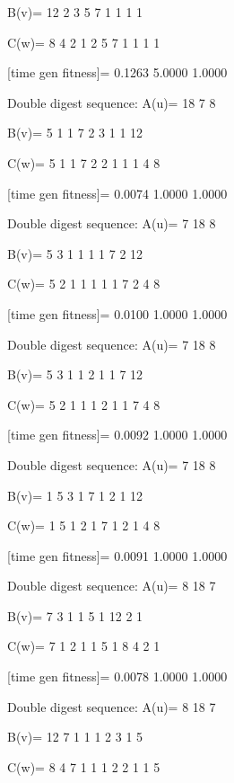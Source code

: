 B(v)=
    12     2     3     5     7     1     1     1     1

C(w)=
     8     4     2     1     2     5     7     1     1     1     1

[time gen fitness]=
    0.1263    5.0000    1.0000

Double digest sequence:
A(u)=
    18     7     8

B(v)=
     5     1     1     7     2     3     1     1    12

C(w)=
     5     1     1     7     2     2     1     1     1     4     8

[time gen fitness]=
    0.0074    1.0000    1.0000

Double digest sequence:
A(u)=
     7    18     8

B(v)=
     5     3     1     1     1     1     7     2    12

C(w)=
     5     2     1     1     1     1     1     7     2     4     8

[time gen fitness]=
    0.0100    1.0000    1.0000

Double digest sequence:
A(u)=
     7    18     8

B(v)=
     5     3     1     1     2     1     1     7    12

C(w)=
     5     2     1     1     1     2     1     1     7     4     8

[time gen fitness]=
    0.0092    1.0000    1.0000

Double digest sequence:
A(u)=
     7    18     8

B(v)=
     1     5     3     1     7     1     2     1    12

C(w)=
     1     5     1     2     1     7     1     2     1     4     8

[time gen fitness]=
    0.0091    1.0000    1.0000

Double digest sequence:
A(u)=
     8    18     7

B(v)=
     7     3     1     1     5     1    12     2     1

C(w)=
     7     1     2     1     1     5     1     8     4     2     1

[time gen fitness]=
    0.0078    1.0000    1.0000

Double digest sequence:
A(u)=
     8    18     7

B(v)=
    12     7     1     1     1     2     3     1     5

C(w)=
     8     4     7     1     1     1     2     2     1     1     5

